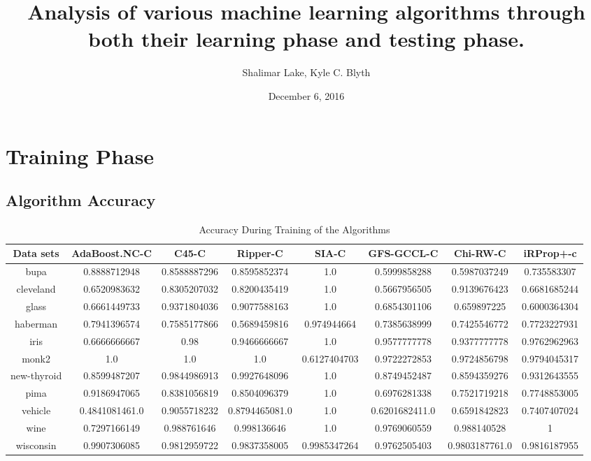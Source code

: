 \documentclass[a4paper,10pt]{article}
\title{Analysis of various machine learning algorithms through both their learning phase and testing phase.}
\author{Shalimar Lake, Kyle C. Blyth}
\date{December 6, 2016}
\begin{document}
\pagestyle{empty}
\maketitle
\thispagestyle{empty}

\pagebreak

\section{Training Phase}

\subsection {Algorithm Accuracy}
\begin {table}[!htp]
\caption {Accuracy During Training of the Algorithms}
\centering
\begin{tiny}
\begin{tabular}{|c|c|c|c|c|c|c|c|}\hline
Data sets&AdaBoost.NC-C&C45-C&Ripper-C&SIA-C&GFS-GCCL-C&Chi-RW-C&iRProp+-c\\\hline
bupa&0.8888712948&0.8588887296&0.8595852374&1.0&0.5999858288&0.5987037249&0.735583307\\
cleveland&0.6520983632&0.8305207032&0.8200435419&1.0&0.5667956505&0.9139676423&0.6681685244\\
glass&0.6661449733&0.9371804036&0.9077588163&1.0&0.6854301106&0.659897225&0.6000364304\\
haberman&0.7941396574&0.7585177866&0.5689459816&0.974944664&0.7385638999&0.7425546772&0.7723227931\\
iris&0.6666666667&0.98&0.9466666667&1.0&0.9577777778&0.9377777778&0.9762962963\\
monk2&1.0&1.0&1.0&0.6127404703&0.9722272853&0.9724856798&0.9794045317\\
new-thyroid&0.8599487207&0.9844986913&0.9927648096&1.0&0.8749452487&0.8594359276&0.9312643555\\
pima&0.9186947065&0.8381056819&0.8504096379&1.0&0.6976281338&0.7521719218&0.7748853005\\
vehicle&0.4841081461.0&0.9055718232&0.8794465081.0&1.0&0.6201682411.0&0.6591842823&0.7407407024\\
wine&0.7297166149&0.988761646&0.998136646&1.0&0.9769060559&0.988140528&1\\
wisconsin&0.9907306085&0.9812959722&0.9837358005&0.9985347264&0.9762505403&0.9803187761.0&0.9816187955\\
\hline
\end{tabular}
\end{tiny}
\end{table}
\flushleft
\end{document}
